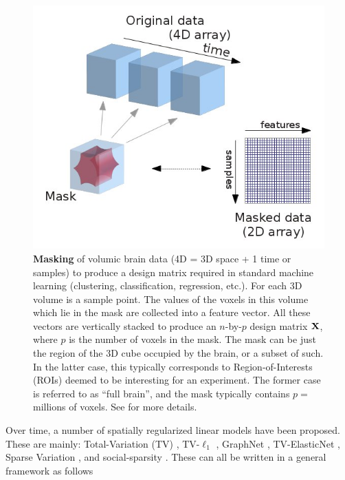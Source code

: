 
  \begin{figure}[!htb] 
  \includegraphics[width=1\linewidth]{figures/masking.jpg}
  \caption{\textbf{Masking} of volumic brain data (4D = 3D space + 1 time or samples)
    to produce a design matrix required in standard machine learning (clustering, classification, regression, etc.). For each 3D volume is a sample point. The values of the voxels in this volume which lie in the mask are collected into a feature vector. All these vectors are vertically stacked to produce an $n$-by-$p$ design matrix $\mathbf{X}$, where $p$ is the number of voxels in the mask. The mask can be just the region of the 3D cube occupied by the brain, or a subset of such. In the latter case, this typically corresponds to Region-of-Interests (ROIs) deemed to be interesting for an experiment. The former case is referred to as ``full brain'', and the mask typically contains $p = $ millions of voxels. See \citep{abraham2014machine} for more details.}
  \label{fig:masking}
\end{figure}

Over time, a number of spatially regularized linear models have been proposed. These are mainly: Total-Variation (TV)
   \citep{michel2011tv}, TV-$\ell_1$  \citep{baldassarre2012,gramfort2013}, GraphNet  \citep{grosenick2013,hebiri2011},
  TV-ElasticNet  \citep{dubois2014predictive}, Sparse Variation  \citep{eickenberg2015total}, and social-sparsity  \citep{kowalski2013social}. These can all be written in a general framework as follows
  
